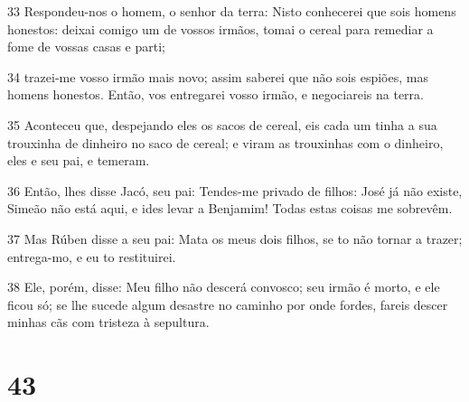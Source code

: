 \par 33 Respondeu-nos o homem, o senhor da terra: Nisto conhecerei que sois homens honestos: deixai comigo um de vossos irmãos, tomai o cereal para remediar a fome de vossas casas e parti;
\par 34 trazei-me vosso irmão mais novo; assim saberei que não sois espiões, mas homens honestos. Então, vos entregarei vosso irmão, e negociareis na terra.
\par 35 Aconteceu que, despejando eles os sacos de cereal, eis cada um tinha a sua trouxinha de dinheiro no saco de cereal; e viram as trouxinhas com o dinheiro, eles e seu pai, e temeram.
\par 36 Então, lhes disse Jacó, seu pai: Tendes-me privado de filhos: José já não existe, Simeão não está aqui, e ides levar a Benjamim! Todas estas coisas me sobrevêm.
\par 37 Mas Rúben disse a seu pai: Mata os meus dois filhos, se to não tornar a trazer; entrega-mo, e eu to restituirei.
\par 38 Ele, porém, disse: Meu filho não descerá convosco; seu irmão é morto, e ele ficou só; se lhe sucede algum desastre no caminho por onde fordes, fareis descer minhas cãs com tristeza à sepultura.

\chapter{43}

